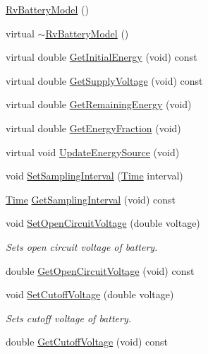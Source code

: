 \begin{DoxyCompactItemize}
\item 
\hyperlink{classns3_1_1RvBatteryModel_ae88b599d504056559bf2de38391a17da}{Rv\+Battery\+Model} ()
\item 
virtual \hyperlink{classns3_1_1RvBatteryModel_ae7fa8a5f2752822529e48abf2c7058f9}{$\sim$\+Rv\+Battery\+Model} ()
\item 
virtual double \hyperlink{classns3_1_1RvBatteryModel_a758f091570aee1b6618376217f6b3b19}{Get\+Initial\+Energy} (void) const 
\item 
virtual double \hyperlink{classns3_1_1RvBatteryModel_afacc0bd74d865bdbfc51c515cff7efee}{Get\+Supply\+Voltage} (void) const 
\item 
virtual double \hyperlink{classns3_1_1RvBatteryModel_a7ab2862fe0f9006fecefe5ee8a5a1c52}{Get\+Remaining\+Energy} (void)
\item 
virtual double \hyperlink{classns3_1_1RvBatteryModel_a38e73ce97ec3d6d1c996fe897d121060}{Get\+Energy\+Fraction} (void)
\item 
virtual void \hyperlink{classns3_1_1RvBatteryModel_ac0885eeb1b510ffe52531e7e68039d3e}{Update\+Energy\+Source} (void)
\item 
void \hyperlink{classns3_1_1RvBatteryModel_a45087cd749937bacfcf3ba43b5ddb538}{Set\+Sampling\+Interval} (\hyperlink{classns3_1_1Time}{Time} interval)
\item 
\hyperlink{classns3_1_1Time}{Time} \hyperlink{classns3_1_1RvBatteryModel_a9eb804d6f04de072b6f108c4aff55257}{Get\+Sampling\+Interval} (void) const 
\item 
void \hyperlink{classns3_1_1RvBatteryModel_ab086a0fa60589b1232125e9fd183c1b9}{Set\+Open\+Circuit\+Voltage} (double voltage)
\begin{DoxyCompactList}\small\item\em Sets open circuit voltage of battery. \end{DoxyCompactList}\item 
double \hyperlink{classns3_1_1RvBatteryModel_a0040c91bbfaccac6cf549bafc6acfd11}{Get\+Open\+Circuit\+Voltage} (void) const 
\item 
void \hyperlink{classns3_1_1RvBatteryModel_a70d08fb3ddebd46b0ce0daae98af79e6}{Set\+Cutoff\+Voltage} (double voltage)
\begin{DoxyCompactList}\small\item\em Sets cutoff voltage of battery. \end{DoxyCompactList}\item 
double \hyperlink{classns3_1_1RvBatteryModel_a2c6e69ca6fc5f9f12cc3cabe3ff2f3d7}{Get\+Cutoff\+Voltage} (void) const 

\end{DoxyCompactItemize}

